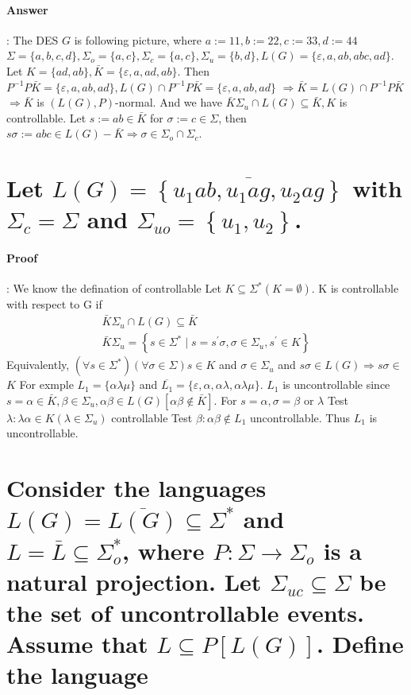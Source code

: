 \documentclass{article}
\begin{document}
\paragraph{Answer}:
The DES $G$ is following picture, where $a:=11, b:=22, c:=33, d:=44$ $\Sigma=\{a, b, c, d\}, \Sigma_o=\{a, c\}, \Sigma_c=\{a, c\}, \Sigma_u=\{b, d\}, L(G)=\{\varepsilon, a, a b, a b c, a d\}$. Let $K=\{a d, a b\}, \bar{K}=\{\varepsilon, a, a d, a b\}$.
Then $P^{-1} P \bar{K}=\{\varepsilon, a, a b, a d\}, L(G) \cap P^{-1} P \bar{K}=\{\varepsilon, a, a b, a d\}$
$\Longrightarrow \bar{K}=L(G) \cap P^{-1} P \bar{K}$
$\Longrightarrow \bar{K}$ is $(L(G), P)$-normal.
And we have $\bar{K} \Sigma_u \cap L(G) \subseteq \bar{K}, K$ is controllable. Let $s:=a b \in \bar{K}$ for $\sigma:=c \in \Sigma$, then $s \sigma:=a b c \in L(G)-\bar{K} \Longrightarrow \sigma \in \Sigma_o \cap \Sigma_c$.

\section{ Let $L(G)=\overline{\left\{u_1 a b, u_1 a g, u_2 a g\right\}}$ with  $\Sigma_c=\Sigma $ and $ \Sigma_{u o}=\left\{u_1, u_2\right\} $.}

\paragraph{Proof}:
We know the defination of controllable Let $K \subseteq \Sigma^*(K=\emptyset)$. $\mathrm{K}$ is controllable with respect to $\mathrm{G}$ if
$$
\begin{array}{r}
\bar{K} \Sigma_u \cap L(G) \subseteq \bar{K} \\
\bar{K} \Sigma_u=\left\{s \in \Sigma^* \mid s=s^{\prime} \sigma, \sigma \in \Sigma_u, s^{\prime} \in K\right\}
\end{array}
$$
Equivalently, $\left(\forall s \in \Sigma^*\right)(\forall \sigma \in \Sigma) s \in K$ and $\sigma \in \Sigma_u$ and $s \sigma \in L(G) \Rightarrow s \sigma \in$
$K$
For exmple $L_1=\{\alpha \lambda \mu\}$ and $\overline{L_1}=\{\varepsilon, \alpha, \alpha \lambda, \alpha \lambda \mu\}$. $L_1$ is uncontrollable since $s=\alpha \in \bar{K}, \beta \in \Sigma_u, \alpha \beta \in L(G)[\alpha \beta \notin \bar{K}]$. For $s=\alpha, \sigma=\beta$ or $\lambda$
Test $\lambda: \lambda \alpha \in K\left(\lambda \in \Sigma_u\right)$ controllable
Test $\beta: \alpha \beta \notin L_1$ uncontrollable. Thus $L_1$ is uncontrollable.

\section{Consider the languages $L(G)=\overline{L(G)} \subseteq \Sigma^*$ and $L=\bar{L} \subseteq \Sigma_o^*$, where $P: \Sigma \rightarrow \Sigma_o$ is a natural projection. Let $\Sigma_{u c} \subseteq \Sigma$ be the set of uncontrollable events. Assume that $L \subseteq P[L(G)]$. Define the language}
\end{document}

